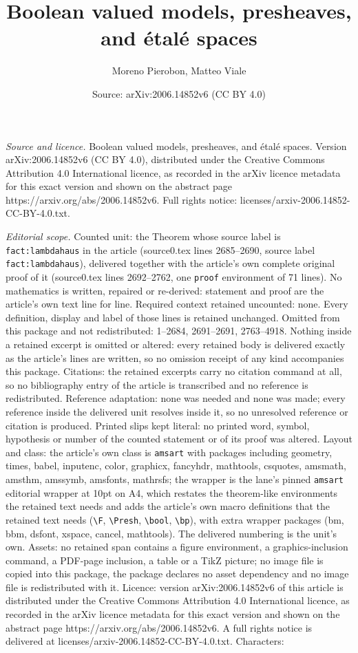 \documentclass[10pt,a4paper]{amsart}
\title[Boolean valued models, presheaves, and \'etal\'e spaces]{Boolean valued models, presheaves, and \'etal\'e spaces}
\author{Moreno Pierobon, Matteo Viale}
\date{Source: arXiv:2006.14852v6 (CC BY 4.0)}
\begin{document}
\maketitle

\noindent\emph{Source and licence.} Boolean valued models, presheaves, and \'etal\'e spaces. Version arXiv:2006.14852v6 (CC BY 4.0), distributed under the Creative Commons Attribution 4.0 International licence, as recorded in the arXiv licence metadata for this exact version and shown on the abstract page https://arxiv.org/abs/2006.14852v6. Full rights notice: licenses/arxiv-2006.14852-CC-BY-4.0.txt.\par\smallskip

\noindent\textit{Editorial scope.} Counted unit: the Theorem whose source label is \texttt{fact:lambdahaus} in the article (source0.tex lines 2685--2690, source label \texttt{fact:lambdahaus}), delivered together with the article's own complete original proof of it (source0.tex lines 2692--2762, one \texttt{proof} environment of 71 lines). No mathematics is written, repaired or re-derived: statement and proof are the article's own text line for line. Required context retained uncounted: none. Every definition, display and label of those lines is retained unchanged. Omitted from this package and not redistributed: 1--2684, 2691--2691, 2763--4918. Nothing inside a retained excerpt is omitted or altered: every retained body is delivered exactly as the article's lines are written, so no omission receipt of any kind accompanies this package. Citations: the retained excerpts carry no citation command at all, so no bibliography entry of the article is transcribed and no reference is redistributed. Reference adaptation: none was needed and none was made; every reference inside the delivered unit resolves inside it, so no unresolved reference or citation is produced. Printed slips kept literal: no printed word, symbol, hypothesis or number of the counted statement or of its proof was altered. Layout and class: the article's own class is \texttt{amsart} with packages including geometry, times, babel, inputenc, color, graphicx, fancyhdr, mathtools, csquotes, amsmath, amsthm, amssymb, amsfonts, mathrsfs; the wrapper is the lane's pinned \texttt{amsart} editorial wrapper at 10pt on A4, which restates the theorem-like environments the retained text needs and adds the article's own macro definitions that the retained text needs (\texttt{\textbackslash F}, \texttt{\textbackslash Presh}, \texttt{\textbackslash bool}, \texttt{\textbackslash bp}), with extra wrapper packages (bm, bbm, dsfont, xspace, cancel, mathtools). The delivered numbering is the unit's own. Assets: no retained span contains a figure environment, a graphics-inclusion command, a PDF-page inclusion, a table or a TikZ picture; no image file is copied into this package, the package declares no asset dependency and no image file is redistributed with it. Licence: version arXiv:2006.14852v6 of this article is distributed under the Creative Commons Attribution 4.0 International licence, as recorded in the arXiv licence metadata for this exact version and shown on the abstract page https://arxiv.org/abs/2006.14852v6. A full rights notice is delivered at licenses/arxiv-2006.14852-CC-BY-4.0.txt. Characters: 
\end{document}

